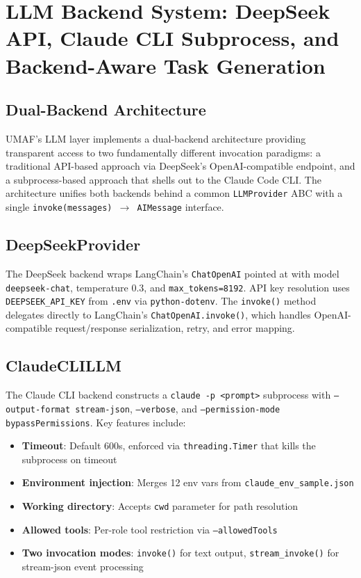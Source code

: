 \section{LLM Backend System: DeepSeek API, Claude CLI Subprocess, and Backend-Aware Task Generation}
\label{sec:backend}

\subsection{Dual-Backend Architecture}

UMAF's LLM layer implements a dual-backend architecture providing transparent access to two fundamentally different invocation paradigms: a traditional API-based approach via DeepSeek's OpenAI-compatible endpoint, and a subprocess-based approach that shells out to the Claude Code CLI. The architecture unifies both backends behind a common \texttt{LLMProvider} ABC with a single \texttt{invoke(messages) $\rightarrow$ AIMessage} interface.

\subsection{DeepSeekProvider}

\raggedright
The DeepSeek backend \cite{deepseekv3} wraps LangChain's \texttt{ChatOpenAI} pointed at  with model \texttt{deepseek-chat}, temperature 0.3, and \texttt{max\_tokens=8192}. API key resolution uses \texttt{DEEPSEEK\_API\_KEY} from \texttt{.env} via \texttt{python-dotenv}. The \texttt{invoke()} method delegates directly to LangChain's \texttt{ChatOpenAI.invoke()}, which handles OpenAI-compatible request/response serialization, retry, and error mapping.

\subsection{ClaudeCLILLM}

The Claude CLI backend \cite{mcp} constructs a \texttt{claude -p <prompt>} subprocess with \texttt{--output-format stream-json}, \texttt{--verbose}, and \texttt{--permission-mode bypassPermissions}. Key features include:
\begin{itemize}
    \item \textbf{Timeout}: Default 600s, enforced via \texttt{threading.Timer} that kills the subprocess on timeout
    \item \textbf{Environment injection}: Merges 12 env vars from \texttt{claude\_env\_sample.json}
    \item \textbf{Working directory}: Accepts \texttt{cwd} parameter for path resolution
    \item \textbf{Allowed tools}: Per-role tool restriction via \texttt{--allowedTools}
    \item \textbf{Two invocation modes}: \texttt{invoke()} for text output, \texttt{stream\_invoke()} for stream-json event processing
\end{itemize}


